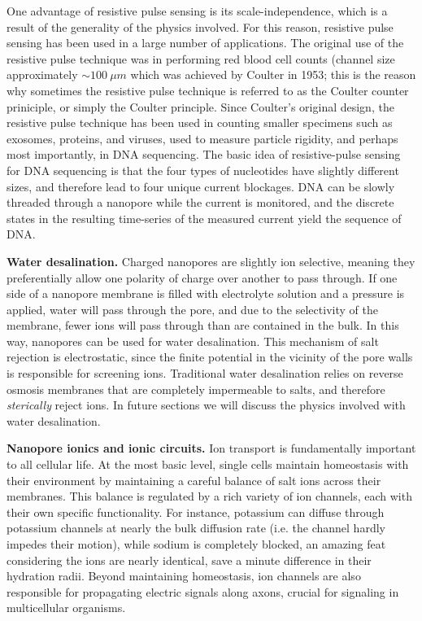 			One advantage of resistive pulse sensing is its scale-independence, which is a result of the generality of the physics involved. For this reason, resistive pulse sensing has been used in a large number of applications. The original use of the resistive pulse technique was in performing red blood cell counts (channel size approximately $\sim\SI{100}{\mu m}$ which was achieved by Coulter in 1953; this is the reason why sometimes the resistive pulse technique is referred to as the Coulter counter priniciple, or simply the Coulter principle. Since Coulter's original design, the resistive pulse technique has been used in counting smaller specimens such as exosomes, proteins, and viruses, used to measure particle rigidity, and perhaps most importantly, in DNA sequencing. The basic idea of resistive-pulse sensing for DNA sequencing is that the four types of nucleotides have slightly different sizes, and therefore lead to four unique current blockages. DNA can be slowly threaded through a nanopore while the current is monitored, and the discrete states in the resulting time-series of the measured current yield the sequence of DNA.

			\textbf{Water desalination.} Charged nanopores are slightly ion selective, meaning they preferentially allow one polarity of charge over another to pass through. If one side of a nanopore membrane is filled with electrolyte solution and a pressure is applied, water will pass through the pore, and due to the selectivity of the membrane, fewer ions will pass through than are contained in the bulk. In this way, nanopores can be used for water desalination. This mechanism of salt rejection is electrostatic, since the finite potential in the vicinity of the pore walls is responsible for screening ions. Traditional water desalination relies on reverse osmosis membranes that are completely impermeable to salts, and therefore \textit{sterically} reject ions.  In future sections we will discuss the physics involved with water desalination.

			\textbf{Nanopore ionics and ionic circuits.} Ion transport is fundamentally important to all cellular life. At the most basic level, single cells maintain homeostasis with their environment by maintaining a careful balance of salt ions across their membranes. This balance is regulated by a rich variety of ion channels, each with their own specific functionality. For instance, potassium can diffuse through potassium channels at nearly the bulk diffusion rate (i.e. the channel hardly impedes their motion), while sodium is completely blocked, an amazing feat considering the ions are nearly identical, save a minute difference in their hydration radii. Beyond maintaining homeostasis, ion channels are also responsible for propagating electric signals along axons, crucial for signaling in multicellular organisms. 

